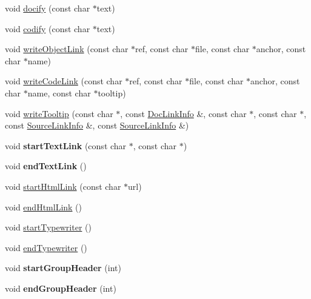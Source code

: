 \begin{DoxyCompactItemize}
\item 
void \hyperlink{class_latex_generator_ab9d90b3c6f2e1105a2fe6ce2a1486f75}{docify} (const char $\ast$text)
\item 
void \hyperlink{class_latex_generator_a96b26b0cb63719fd5370a9a04d2ebb38}{codify} (const char $\ast$text)
\item 
void \hyperlink{class_latex_generator_a78d7e4718290246f77043de949c83081}{write\-Object\-Link} (const char $\ast$ref, const char $\ast$file, const char $\ast$anchor, const char $\ast$name)
\item 
void \hyperlink{class_latex_generator_ab3866da052a840c400b4990dd2ddf61b}{write\-Code\-Link} (const char $\ast$ref, const char $\ast$file, const char $\ast$anchor, const char $\ast$name, const char $\ast$tooltip)
\item 
void \hyperlink{class_latex_generator_a7ff5de02f14ba4c6b98edcaa3483e386}{write\-Tooltip} (const char $\ast$, const \hyperlink{struct_doc_link_info}{Doc\-Link\-Info} \&, const char $\ast$, const char $\ast$, const \hyperlink{struct_source_link_info}{Source\-Link\-Info} \&, const \hyperlink{struct_source_link_info}{Source\-Link\-Info} \&)
\item 
\hypertarget{class_latex_generator_aa1b23d9bacbb6cb75e204111a9f4484c}{void {\bfseries start\-Text\-Link} (const char $\ast$, const char $\ast$)}\label{class_latex_generator_aa1b23d9bacbb6cb75e204111a9f4484c}

\item 
\hypertarget{class_latex_generator_a98515ca43c32f8bc616925eb3c683b6e}{void {\bfseries end\-Text\-Link} ()}\label{class_latex_generator_a98515ca43c32f8bc616925eb3c683b6e}

\item 
void \hyperlink{class_latex_generator_a0746b9c06743e1d4fe527b8317457da1}{start\-Html\-Link} (const char $\ast$url)
\item 
void \hyperlink{class_latex_generator_ac2ba450d319270e186e436167c8609ce}{end\-Html\-Link} ()
\item 
void \hyperlink{class_latex_generator_a2e60bda5e249554e2fc264aa32d9d93e}{start\-Typewriter} ()
\item 
void \hyperlink{class_latex_generator_acb220673316232acd7d1050553dafaf6}{end\-Typewriter} ()
\item 
\hypertarget{class_latex_generator_ac9eee86f35f465f0160ccea844c3b80d}{void {\bfseries start\-Group\-Header} (int)}\label{class_latex_generator_ac9eee86f35f465f0160ccea844c3b80d}

\item 
\hypertarget{class_latex_generator_ae267a69e7fa49c697d1cdce247d81b38}{void {\bfseries end\-Group\-Header} (int)}\label{class_latex_generator_ae267a69e7fa49c697d1cdce247d81b38}


\end{DoxyCompactItemize}
